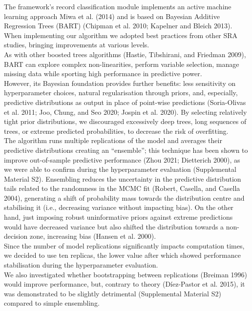 \documentclass{article}
\begin{document}
The framework's record classification module implements an active
machine learning approach Miwa et al. (2014) and is based on Bayesian
Additive Regression Trees (BART) (Chipman et al. 2010; Kapelner and
Bleich 2013). When implementing our algorithm we adopted best practices
from other SRA studies, bringing improvements at various levels.\\
As with other boosted trees algorithms (Hastie, Tibshirani, and Friedman
2009), BART can explore complex non-linearities, perform variable
selection, manage missing data while sporting high performance in
predictive power.\\
However, its Bayesian foundation provides further benefits: less
sensitivity on hyperparameter choices, natural regularisation through
priors, and, especially, predictive distributions as output in place of
point-wise predictions (Soria-Olivas et al. 2011; Joo, Chung, and Seo
2020; Jospin et al. 2020). By selecting relatively tight prior
distributions, we discouraged excessively deep trees, long sequences of
trees, or extreme predicted probabilities, to decrease the risk of
overfitting.\\
The algorithm runs multiple replications of the model and averages their
predictive distributions creating an ``ensemble''; this technique has
been shown to improve out-of-sample predictive performance (Zhou 2021;
Dietterich 2000), as we were able to confirm during the hyperparameter
evaluation (Supplemental Material S2). Ensembling reduces the
uncertainty in the predictive distribution tails related to the
randomness in the MCMC fit (Robert, Casella, and Casella 2004),
generating a shift of probability mass towards the distribution centre
and stabilising it (i.e., decreasing variance without impacting bias).
On the other hand, just imposing robust uninformative priors against
extreme predictions would have decreased variance but also shifted the
distribution towards a non-decision zone, increasing bias (Hansen et al.
2000).\\
Since the number of model replications significantly impacts computation
times, we decided to use ten replicas, the lower value after which
showed performance stabilisation during the hyperparameter evaluation.\\
We also investigated whether bootstrapping between replications (Breiman
1996) would improve performance, but, contrary to theory (Díez-Pastor et
al. 2015), it was demonstrated to be slightly detrimental (Supplemental
Material S2) compared to simple ensembling.\\
\end{document}
